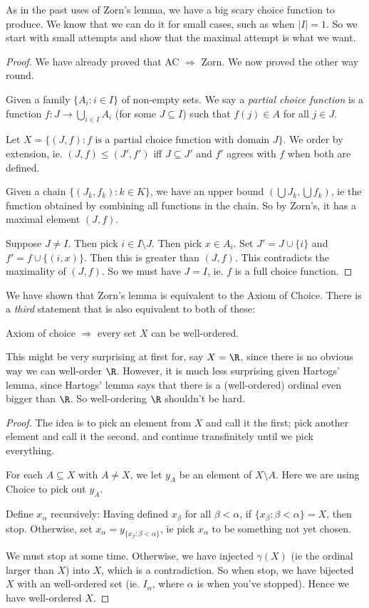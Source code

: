 \documentclass[a4paper]{article}
\begin{document}
As in the past uses of Zorn's lemma, we have a big scary choice function to produce. We know that we can do it for small cases, such as when $|I| = 1$. So we start with small attempts and show that the maximal attempt is what we want.
\begin{proof}
  We have already proved that AC $\Rightarrow $ Zorn. We now proved the other way round.

  Given a family $\{A_i: i\in I\}$ of non-empty sets. We say a \emph{partial choice function} is a function $f: J\to \bigcup_{i\in I}A_i$ (for some $J\subseteq I$) such that $f(j)\in A$ for all $j\in J$.

  Let $X = \{(J, f): f\text{ is a partial choice function with domain }J\}$. We order by extension, ie. $(J, f) \leq (J', f')$ iff $J\subseteq J'$ and $f'$ agrees with $f$ when both are defined.

  Given a chain $\{(J_k, f_k): k\in K\}$, we have an upper bound $\left(\bigcup J_k, \bigcup f_k\right)$, ie the function obtained by combining all functions in the chain. So by Zorn's, it has a maximal element $(J, f)$.

  Suppose $J \not = I$. Then pick $i\in I\setminus J$. Then pick $x\in A_i$. Set $J' = J\cup \{i\}$ and $f' = f\cup\{(i, x)\}$. Then this is greater than $(J, f)$. This contradicts the maximality of $(J, f)$. So we must have $J = I$, ie. $f$ is a full choice function.
\end{proof}

We have shown that Zorn's lemma is equivalent to the Axiom of Choice. There is a \emph{third} statement that is also equivalent to both of these:
\begin{thm}
  Axiom of choice $\Rightarrow$ every set $X$ can be well-ordered.
\end{thm}
This might be very surprising at first for, say $X = \R$, since there is no obvious way we can well-order $\R$. However, it is much less surprising given Hartogs' lemma, since Hartogs' lemma says that there is a (well-ordered) ordinal even bigger than $\R$. So well-ordering $\R$ shouldn't be hard.

\begin{proof}
  The idea is to pick an element from $X$ and call it the first; pick another element and call it the second, and continue transfinitely until we pick everything.

  For each $A\subseteq X$ with $A\not= X$, we let $y_A$ be an element of $X\setminus A$. Here we are using Choice to pick out $y_A$.

  Define $x_\alpha$ recursively: Having defined $x_{\beta}$ for all $\beta < \alpha$, if $\{x_\beta: \beta < \alpha\} = X$, then stop. Otherwise, set $x_\alpha = y_{\{x_\beta: \beta< \alpha\}}$, ie pick $x_\alpha$ to be something not yet chosen.

  We must stop at some time. Otherwise, we have injected $\gamma(X)$ (ie the ordinal larger than $X$) into $X$, which is a contradiction. So when stop, we have bijected $X$ with an well-ordered set (ie. $I_\alpha$, where $\alpha$ is when you've stopped). Hence we have well-ordered $X$.
\end{proof}
\end{document}
